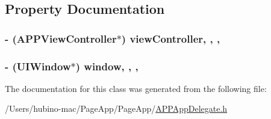 \subsection{Property Documentation}
\hypertarget{interface_a_p_p_app_delegate_a4c52917da489f30f98d31b4aae72a3cf}{
\subsubsection[{view\+Controller}]{\setlength{\rightskip}{0pt plus 5cm}-\/ ({\bf A\+P\+P\+View\+Controller}$\ast$) view\+Controller\hspace{0.3cm}{\ttfamily [read]}, {\ttfamily [write]}, {\ttfamily [nonatomic]}, {\ttfamily [strong]}}}\label{interface_a_p_p_app_delegate_a4c52917da489f30f98d31b4aae72a3cf}
\hypertarget{interface_a_p_p_app_delegate_a4b8f6d91c1115b02d85644fff0f447c7}{
\subsubsection[{window}]{\setlength{\rightskip}{0pt plus 5cm}-\/ (U\+I\+Window$\ast$) window\hspace{0.3cm}{\ttfamily [read]}, {\ttfamily [write]}, {\ttfamily [nonatomic]}, {\ttfamily [strong]}}}\label{interface_a_p_p_app_delegate_a4b8f6d91c1115b02d85644fff0f447c7}


The documentation for this class was generated from the following file\+:\begin{DoxyCompactItemize}
\item 
/\+Users/hubino-\/mac/\+Page\+App/\+Page\+App/\hyperlink{_a_p_p_app_delegate_8h}{A\+P\+P\+App\+Delegate.\+h}\end{DoxyCompactItemize}
